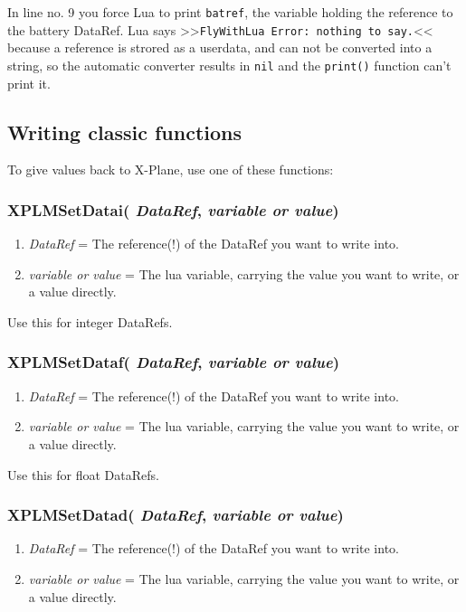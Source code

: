 \documentclass[11pt,parskip=half,a4paper]{scrartcl}
\begin{document}
In line no. 9 you force Lua to print \verb|batref|, the variable holding the reference to the battery DataRef. Lua says >>\verb|FlyWithLua Error: nothing to say.|<< because a reference is strored as a userdata, and can not be converted into a string, so the automatic converter results in \verb|nil| and the \verb|print()| function can't print it.

\newpage
\subsection{Writing classic functions}

To give values back to X-Plane, use one of these functions:

\subsubsection{XPLMSetDatai( \emph{DataRef}, \emph{variable or value})}

\begin{enumerate}
	\item \emph{DataRef} = The reference(!) of the DataRef you want to write into.
	\item \emph{variable or value} = The lua variable, carrying the value you want to write, or a value directly.
\end{enumerate}

Use this for integer DataRefs.

\subsubsection{XPLMSetDataf( \emph{DataRef}, \emph{variable or value})}

\begin{enumerate}
	\item \emph{DataRef} = The reference(!) of the DataRef you want to write into.
	\item \emph{variable or value} = The lua variable, carrying the value you want to write, or a value directly.
\end{enumerate}

Use this for float DataRefs.

\subsubsection{XPLMSetDatad( \emph{DataRef}, \emph{variable or value})}

\begin{enumerate}
	\item \emph{DataRef} = The reference(!) of the DataRef you want to write into.
	\item \emph{variable or value} = The lua variable, carrying the value you want to write, or a value directly.
\end{enumerate}
\end{document}
